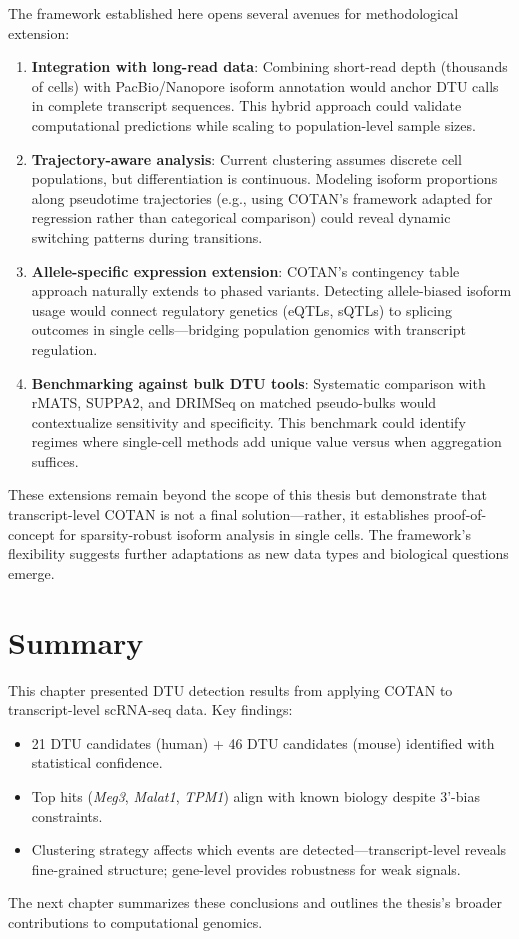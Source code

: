 The framework established here opens several avenues for methodological extension:
\begin{enumerate}
    \item \textbf{Integration with long-read data}: Combining short-read depth (thousands of cells) with PacBio/Nanopore isoform annotation would anchor DTU calls in complete transcript sequences. This hybrid approach could validate computational predictions while scaling to population-level sample sizes.

    \item \textbf{Trajectory-aware analysis}: Current clustering assumes discrete cell populations, but differentiation is continuous. Modeling isoform proportions along pseudotime trajectories (e.g., using COTAN's framework adapted for regression rather than categorical comparison) could reveal dynamic switching patterns during transitions.

    \item \textbf{Allele-specific expression extension}: COTAN's contingency table approach naturally extends to phased variants. Detecting allele-biased isoform usage would connect regulatory genetics (eQTLs, sQTLs) to splicing outcomes in single cells---bridging population genomics with transcript regulation.

    \item \textbf{Benchmarking against bulk DTU tools}: Systematic comparison with rMATS, SUPPA2, and DRIMSeq on matched pseudo-bulks would contextualize sensitivity and specificity. This benchmark could identify regimes where single-cell methods add unique value versus when aggregation suffices.
\end{enumerate}

These extensions remain beyond the scope of this thesis but demonstrate that transcript-level COTAN is not a final solution---rather, it establishes proof-of-concept for sparsity-robust isoform analysis in single cells. The framework's flexibility suggests further adaptations as new data types and biological questions emerge.

\section*{Summary}

This chapter presented DTU detection results from applying COTAN to transcript-level scRNA-seq data. Key findings:
\begin{itemize}
    \item 21 DTU candidates (human) + 46 DTU candidates (mouse) identified with statistical confidence.
    \item Top hits (\textit{Meg3}, \textit{Malat1}, \textit{TPM1}) align with known biology despite 3'-bias constraints.
    \item Clustering strategy affects which events are detected---transcript-level reveals fine-grained structure; gene-level provides robustness for weak signals.
\end{itemize}

The next chapter summarizes these conclusions and outlines the thesis's broader contributions to computational genomics.